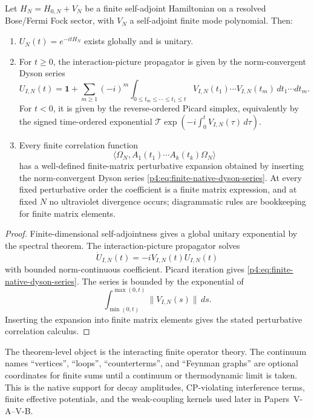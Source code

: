 \documentclass[12pt,a4paper]{article}
\begin{document}
\begin{theorem}
\label{p4:thm:finite-interacting-qft-calculus}
Let \(H_N=H_{0,N}+V_N\) be a finite self-adjoint Hamiltonian on a resolved Bose/Fermi Fock sector, with \(V_N\) a self-adjoint finite mode polynomial.  Then:
\begin{enumerate}
\item \(U_N(t)=e^{-itH_N}\) exists globally and is unitary.
\item For \(t\ge0\), the interaction-picture propagator is given by the
norm-convergent Dyson series
\begin{equation}
\label{p4:eq:finite-native-dyson-series}
U_{I,N}(t)
=
\mathbf 1+
\sum_{m\ge1}(-i)^m
\int_{0\le t_m\le\cdots\le t_1\le t}
V_{I,N}(t_1)\cdots V_{I,N}(t_m)\,dt_1\cdots dt_m .
\end{equation}
For \(t<0\), it is given by the reverse-ordered Picard simplex,
equivalently by the signed time-ordered exponential
\(\mathcal T\exp(-i\int_0^tV_{I,N}(\tau)\,d\tau)\).
\item Every finite correlation function
\[
\langle\Omega_N,A_1(t_1)\cdots A_k(t_k)\Omega_N\rangle
\]
has a well-defined finite-matrix perturbative expansion obtained by inserting the norm-convergent Dyson series \eqref{p4:eq:finite-native-dyson-series}.  At every fixed perturbative order the coefficient is a finite matrix expression, and at fixed \(N\) no ultraviolet divergence occurs; diagrammatic rules are bookkeeping for finite matrix elements.
\end{enumerate}
\end{theorem}


\begin{proof}
Finite-dimensional self-adjointness gives a global unitary exponential by the
spectral theorem.  The interaction-picture propagator solves
\[
  \dot U_{I,N}(t)=-iV_{I,N}(t)U_{I,N}(t)
\]
with bounded norm-continuous coefficient.  Picard iteration gives
\eqref{p4:eq:finite-native-dyson-series}.  The series is bounded by the
exponential of
\[
  \int_{\min(0,t)}^{\max(0,t)}\|V_{I,N}(s)\|\,ds .
\]
Inserting the expansion into finite matrix elements gives the stated
perturbative correlation calculus.
\end{proof}

\begin{remark}
\label{p4:rem:finite-interaction-status}
The theorem-level object is the interacting finite operator theory.  The continuum names ``vertices'', ``loops'', ``counterterms'', and ``Feynman graphs'' are optional coordinates for finite sums until a continuum or thermodynamic limit is taken.  This is the native support for decay amplitudes, CP-violating interference terms, finite effective potentials, and the weak-coupling kernels used later in Papers~V-A--V-B.
\end{remark}
\end{document}

